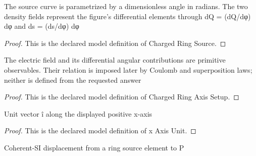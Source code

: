\begin{definition}
  \label{def:physics:phyx-mini-0995:phyxminiproblems-problemphyxmini0995-chargedringsource}
  The source curve is parametrized by a dimensionless angle in radians. The two density fields represent the figure's differential elements through dQ = (dQ/dφ) dφ and ds = (ds/dφ) dφ
\end{definition}
\begin{proof}
  This is the declared model definition of Charged Ring Source.
\end{proof}
\begin{definition}
  \label{def:physics:phyx-mini-0995:phyxminiproblems-problemphyxmini0995-chargedringaxissetup}
  The electric field and its differential angular contributions are primitive observables. Their relation is imposed later by Coulomb and superposition laws; neither is defined from the requested answer
\end{definition}
\begin{proof}
  This is the declared model definition of Charged Ring Axis Setup.
\end{proof}
\begin{definition}
  \label{def:physics:phyx-mini-0995:phyxminiproblems-problemphyxmini0995-xaxisunit}
  Unit vector î along the displayed positive x-axis
\end{definition}
\begin{proof}
  This is the declared model definition of x Axis Unit.
\end{proof}
\begin{definition}
  \label{def:physics:phyx-mini-0995:phyxminiproblems-problemphyxmini0995-sourcetoobservationdisplacementinmeters}
  Coherent-SI displacement from a ring source element to P
\end{definition}
